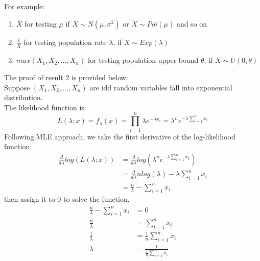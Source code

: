\documentclass[12pt ]{article}
\begin{document}
For example: 
\begin{enumerate}
\item $\bar{X}$ for testing $\mu$ if $X \sim N(\mu, \sigma^2)$ or $X \sim Poi(\mu)$ and so on
\item $\frac{1}{\bar{X}}$ for testing population rate $\lambda$, if $X \sim Exp(\lambda)$
\item $max(X_{1}, X_{2}, \ldots, X_{n})$ for testing population upper bound $\theta$, if $X \sim U(0, \theta)$
\end{enumerate}
\color{blue}
The proof of result 2 is provided below: \\
Suppose $(X_{1}, X_{2}, \ldots, X_{n})$ are idd random variables fall into exponential distribution. \\
The likelihood function is:
\begin{equation*}
L(\lambda; x) = f_{\lambda}(x) = \prod_{i= 1}^{n} \lambda e^{-\lambda x_{i}} = \lambda^n e^{-\lambda \sum_{i=1}^{n}x_{i}}
\end{equation*}
Following MLE approach, we take the first derivative of the log-likelihood function:
\begin{align*}
\frac{d}{d\lambda} log(L(\lambda;x)) &= \frac{d}{d\lambda} log (\lambda^n e^{-\lambda \sum_{i=1}^{n}x_{I}}) \\
&= \frac{d}{d\lambda} nlog(\lambda) - \lambda \sum_{i=1}^{n}x_{i} \\
&= \frac{n}{\lambda} - \sum_{i=1}^{n}x_{i}
\end{align*}
then assign it to 0 to solve the function,
\begin{align*}
\frac{n}{\lambda} - \sum_{i=1}^{n}x_{i} &= 0 \\
\frac{n}{\lambda} &= \sum_{i=1}^{n}x_{i} \\
\frac{1}{\lambda} &= \frac{1}{n}\sum_{i=1}^{n}x_{i} \\
\lambda &= \frac{1}{\frac{1}{n}\sum_{i=1}^{n}x_{i}}
\end{align*}
\color{black}
\end{document}
